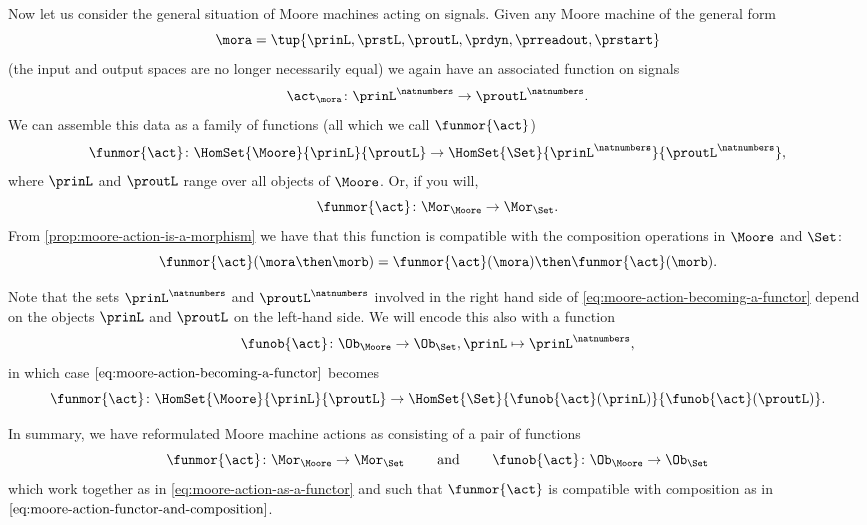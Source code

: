 Now let us consider the general situation of Moore machines acting on signals. Given any Moore machine of the general form 
$$\mora = \tup{\prinL,\prstL,\proutL,\prdyn,\prreadout,\prstart}$$ 
(the input and output spaces are no longer necessarily equal) we again have an associated function on signals
\begin{equation}
\act_{\mora} \colon {\prinL}^\natnumbers \to {\proutL}^\natnumbers.
\end{equation}
We can assemble this data as a family of functions (all which we call $\funmor{\act}$)
\begin{equation}
\label{eq:moore-action-becoming-a-functor}
\funmor{\act} \colon  \HomSet{\Moore}{\prinL}{\proutL} \to \HomSet{\Set}{\prinL^{\natnumbers}}{\proutL^{\natnumbers}},
\end{equation}
where $\prinL$ and $\proutL$ range over all objects of $\Moore$. Or, if you will, 
$$
\funmor{\act} \colon \Mor_\Moore \to \Mor_\Set.
$$
From \cref{prop:moore-action-is-a-morphism} we have that this function is compatible with the composition operations in $\Moore$ and $\Set$: 
\begin{equation}
\label{eq:moore-action-functor-and-composition}
\funmor{\act}(\mora \then \morb) = \funmor{\act}(\mora) \then \funmor{\act}(\morb). 
\end{equation}
 

Note that the sets $\prinL^{\natnumbers}$ and $\proutL^{\natnumbers}$ involved in the right hand side of \cref{eq:moore-action-becoming-a-functor} depend on the objects $\prinL$ and $\proutL$ on the left-hand side. We will encode this also with a function 
\begin{equation}
\funob{\act} \colon \Ob_{\Moore} \to \Ob_{\Set}, \prinL \mapsto \prinL^\natnumbers,
\end{equation}
in which case $\cref{eq:moore-action-becoming-a-functor}$ becomes
\begin{equation}
\label{eq:moore-action-as-a-functor}
\funmor{\act} \colon  \HomSet{\Moore}{\prinL}{\proutL} \to \HomSet{\Set}{ \funob{\act}(\prinL)}{\funob{\act}(\proutL)}.
\end{equation}

In summary, we have reformulated Moore machine actions as consisting of a pair of functions 
\begin{equation}
\funmor{\act} \colon \Mor_\Moore \to \Mor_\Set \qquad \text{ and } \qquad \funob{\act} \colon \Ob_{\Moore} \to \Ob_{\Set}
\end{equation}
which work together as in \cref{eq:moore-action-as-a-functor} and such that $\funmor{\act}$ is compatible with composition as in $\cref{eq:moore-action-functor-and-composition}$. 

